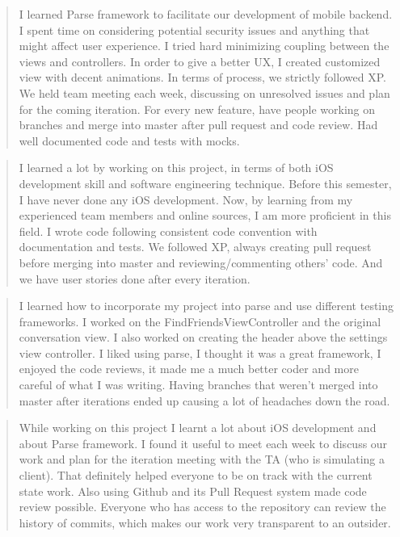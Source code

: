 \begin{quote}
I learned Parse framework to facilitate our development of mobile backend. I spent time on considering potential security issues and anything that might affect user experience. I tried hard minimizing coupling between the views and controllers. In order to give a better UX, I created customized view with decent animations. In terms of process, we strictly followed XP. We held team meeting each week, discussing on unresolved issues and plan for the coming iteration. For every new feature, have people working on branches and merge into master after pull request and code review. Had well documented code and tests with mocks.
\end{quote}

\begin{quote}
I learned a lot by working on this project, in terms of both iOS development skill and software engineering technique. Before this semester, I have never done any iOS development. Now, by learning from my experienced team members and online sources, I am more proficient in this field. I wrote code following consistent code convention with documentation and tests. We followed XP, always creating pull request before merging into master and reviewing/commenting others’ code. And we have user stories done after every iteration.
\end{quote}

\begin{quote}
I learned how to incorporate my project into parse and use different testing frameworks. I worked on the FindFriendsViewController and the original conversation view. I also worked on creating the header above the settings view controller. I liked using parse, I thought it was a great framework, I enjoyed the code reviews, it made me a much better coder and more careful of what I was writing. Having branches that weren't merged into master after iterations ended up causing a lot of headaches down the road.
\end{quote}

\begin{quote}
While working on this project I learnt a lot about iOS development and about Parse framework. I found it useful to meet each week to discuss our work and plan for the iteration meeting with the TA (who is simulating a client). That definitely helped everyone to be on track with the current state work. Also using Github and its Pull Request system made code review possible. Everyone who has access to the repository can review the history of commits, which makes our work very transparent to an outsider.
\end{quote}
